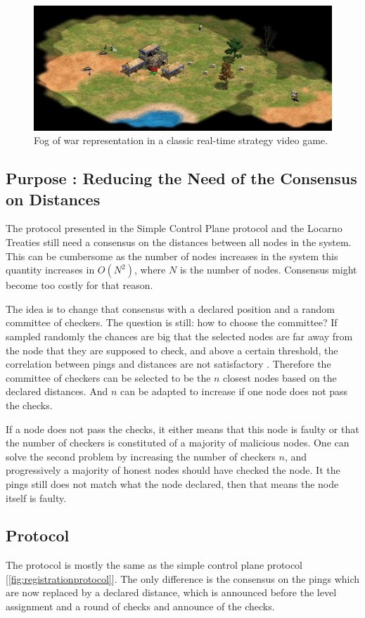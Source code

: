 \documentclass[a4paper,11pt,oneside]{report}
\begin{document}
\begin{figure}[!h] 
\centering
\includegraphics[width=400pt]{figures/fog_of_war}
\caption{Fog of war representation in a classic real-time strategy video game. }
\label{fig:fog-of-the-war}
\end{figure}

\subsection{Purpose : Reducing the Need of the Consensus on Distances}
The protocol presented in the Simple Control Plane protocol and the Locarno
Treaties still need a consensus on the distances between all nodes in the system.
This can be cumbersome as the number of nodes increases in the system this
quantity increases in $O(N^2)$, where $N$ is the number of nodes. Consensus
might become too costly for that reason.

The idea is to change that consensus with a declared position and a random
committee of checkers. The question is still: how to choose the committee? If
sampled randomly the chances are big that the selected nodes are far away
from the node that they are supposed to check, and above a certain threshold,
the correlation between pings and distances are not satisfactory
\cite{Katz-bassett2006}. Therefore the committee of checkers can be selected to
be the $n$ closest nodes based on the declared distances. And $n$ can be
adapted to increase if one node does not pass the checks. 

If a node does not pass the checks, it either means that this node is faulty or
that the number of checkers is constituted of a majority of malicious nodes.
One can solve the second problem by increasing the number of checkers $n$, and
progressively a majority of honest nodes should have checked the node. It the
pings still does not match what the node declared, then that means the node itself is faulty. 

\subsection{Protocol}
The protocol is mostly the same as the simple control plane protocol
[\autoref{fig:registrationprotocol}]. The only difference is the consensus on
the pings which are now replaced by a declared distance, which is announced
before the level assignment and a round of checks and announce of the checks. 
\end{document}

